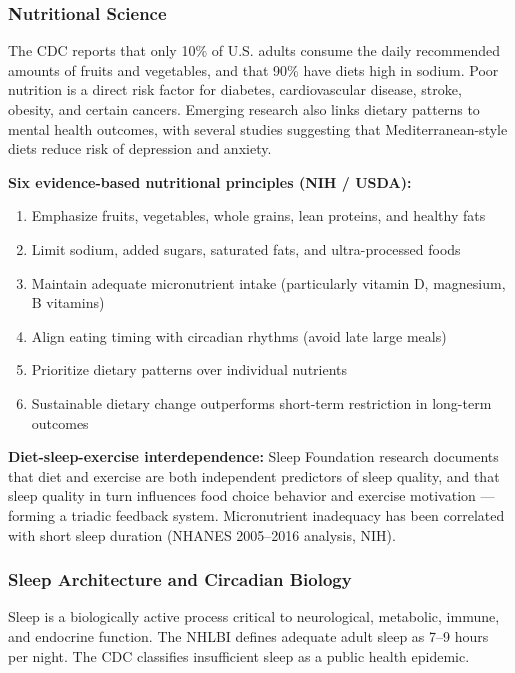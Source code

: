 \documentclass[11pt,letterpaper]{article}
\begin{document}
\subsubsection{Nutritional Science}

The CDC reports that only 10\% of U.S. adults consume the daily recommended amounts of fruits and vegetables, and that 90\% have diets high in sodium. Poor nutrition is a direct risk factor for diabetes, cardiovascular disease, stroke, obesity, and certain cancers. Emerging research also links dietary patterns to mental health outcomes, with several studies suggesting that Mediterranean-style diets reduce risk of depression and anxiety.

\textbf{Six evidence-based nutritional principles (NIH / USDA):}
\begin{enumerate}[leftmargin=1.5em]
  \item Emphasize fruits, vegetables, whole grains, lean proteins, and healthy fats
  \item Limit sodium, added sugars, saturated fats, and ultra-processed foods
  \item Maintain adequate micronutrient intake (particularly vitamin D, magnesium, B vitamins)
  \item Align eating timing with circadian rhythms (avoid late large meals)
  \item Prioritize dietary patterns over individual nutrients
  \item Sustainable dietary change outperforms short-term restriction in long-term outcomes
\end{enumerate}

\textbf{Diet-sleep-exercise interdependence:} Sleep Foundation research documents that diet and exercise are both independent predictors of sleep quality, and that sleep quality in turn influences food choice behavior and exercise motivation --- forming a triadic feedback system. Micronutrient inadequacy has been correlated with short sleep duration (NHANES 2005--2016 analysis, NIH).

\subsubsection{Sleep Architecture and Circadian Biology}

Sleep is a biologically active process critical to neurological, metabolic, immune, and endocrine function. The NHLBI defines adequate adult sleep as 7--9 hours per night. The CDC classifies insufficient sleep as a public health epidemic.
\end{document}
